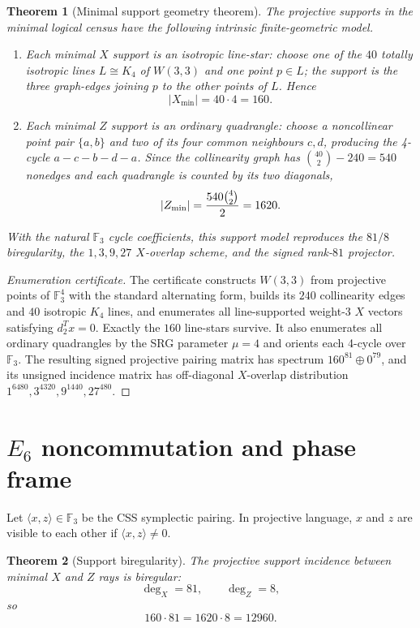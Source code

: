 \documentclass[12pt]{article}
\newtheorem{theorem}{Theorem}[section]
\newcommand{\F}{\mathbb F}
\newcommand{\Xmin}{X_{\min}}
\newcommand{\Zmin}{Z_{\min}}
\begin{document}
\begin{theorem}[Minimal support geometry theorem]
The projective supports in the minimal logical census have the following intrinsic finite-geometric model.
\begin{enumerate}[label=(\roman*)]
\item Each minimal $X$ support is an \emph{isotropic line-star}: choose one of the $40$ totally isotropic lines $L\cong K_4$ of $W(3,3)$ and one point $p\in L$; the support is the three graph-edges joining $p$ to the other points of $L$.  Hence
\[
        |\Xmin|=40\cdot4=160.
\]
\item Each minimal $Z$ support is an \emph{ordinary quadrangle}: choose a noncollinear point pair $\{a,b\}$ and two of its four common neighbours $c,d$, producing the 4-cycle $a-c-b-d-a$.  Since the collinearity graph has ${40\choose2}-240=540$ nonedges and each quadrangle is counted by its two diagonals,
\[
        |\Zmin|={540{4\choose2}\over2}=1620.
\]
\end{enumerate}
With the natural $\F_3$ cycle coefficients, this support model reproduces the $81/8$ biregularity, the $1,3,9,27$ $X$-overlap scheme, and the signed rank-$81$ projector.
\end{theorem}

\begin{proof}[Enumeration certificate]
The certificate constructs $W(3,3)$ from projective points of $\F_3^4$ with the standard alternating form, builds its $240$ collinearity edges and $40$ isotropic $K_4$ lines, and enumerates all line-supported weight-$3$ $X$ vectors satisfying $d_2^T x=0$.  Exactly the $160$ line-stars survive.  It also enumerates all ordinary quadrangles by the SRG parameter $\mu=4$ and orients each 4-cycle over $\F_3$.  The resulting signed projective pairing matrix has spectrum $160^{81}\oplus0^{79}$, and its unsigned incidence matrix has off-diagonal $X$-overlap distribution $1^{6480},3^{4320},9^{1440},27^{480}$.
\end{proof}

\section{$E_6$ noncommutation and phase frame}

Let $\langle x,z\rangle\in\F_3$ be the CSS symplectic pairing.  In projective language, $x$ and $z$ are visible to each other if $\langle x,z\rangle\ne0$.

\begin{theorem}[Support biregularity]
The projective support incidence between minimal $X$ and $Z$ rays is biregular:
\[
        \deg_X=81,
        \qquad
        \deg_Z=8,
\]
so
\[
        160\cdot81=1620\cdot8=12960.
\]
\end{theorem}
\end{document}
